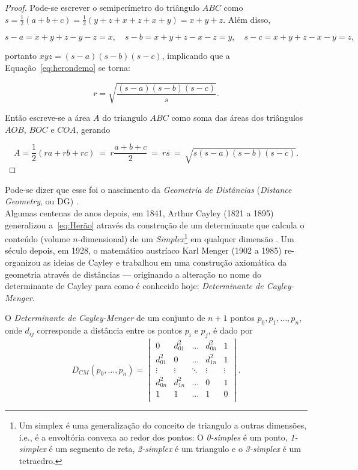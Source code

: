 \begin{teorema}
\begin{proof}
		\noindent Pode-se escrever o semiperímetro do triângulo $ABC$ como $s=\frac{1}{2}(a+b+c)=\frac{1}{2}(y+z+x+z+x+y) = x+y+z$. Além disso,
		
		$$s-a=x+y+z-y-z=x, \quad s-b = x+y+z-x-z = y, \quad s-c = x+y+z-x-y=z,$$
		
		\noindent portanto $xyz = (s-a)(s-b)(s-c)$, implicando que a Equação~\ref{eq:herondemo} se torna:
		
		$$r = \sqrt{\frac{(s-a)(s-b)(s-c)}{s}}.$$
		
		\noindent Então escreve-se a área $A$ do triangulo $ABC$ como soma das áreas dos triângulos $AOB$, $BOC$ e $COA$, gerando
		
		$$A = \frac{1}{2}(ra + rb+ rc) \ =\ r\frac{a+b+c}{2} \ =\ rs \ =\ \sqrt{s(s-a)(s-b)(s-c)}.$$
	\end{proof}
\end{teorema}

Pode-se dizer que esse foi o nascimento da \textit{Geometria de Distâncias} (\textit{Distance Geometry}, ou DG) \cite{libertiSixGemsDGHistory}.
\\

Algumas centenas de anos depois, em 1841, Arthur Cayley (1821 a 1895) generalizou a~\ref{eq:Herão} através da construção de um determinante que calcula o conteúdo (volume $n$-dimensional) de um \textit{Simplex}\footnote{Um simplex é uma generalização do conceito de triangulo a outras dimensões, i.e., é a envoltória convexa ao redor dos pontos: O \textit{0-simples} é um ponto, \textit{1-simplex} é um segmento de reta, \textit{2-simplex} é um triangulo e o \textit{3-simplex} é um tetraedro.} em qualquer dimensão \cite{cayley1841HaronGD, douglasGD}. Um século depois, em 1928, o matemático austríaco Karl Menger (1902 a 1985) re-organizou as ideias de Cayley e trabalhou em uma construção axiomática da geometria através de distâncias \cite{mengerDeterminante} --- originando a alteração no nome do determinante de Cayley para como é conhecido hoje: \textit{Determinante de Cayley-Menger}.  

\begin{definicao}
	O \emph{Determinante de Cayley-Menger} de um conjunto de $n+1$ pontos $p_0,p_1,\dots,p_n$, onde $d_{ij}$ corresponde a distância entre os pontos $p_i$ e $p_j$, é dado por
	\begin{equation}\tag{Determinante de Cayley-Menger}
		D_{CM}(p_0,\dots,p_n) = 
		\begin{vmatrix}
			0 & d^2_{01} & \ldots & d^2_{0n} & 1\\ 
			d^2_{01} & 0 & \ldots & d^2_{1n} & 1\\ 
			\vdots & \vdots & \ddots & \vdots & \vdots\\ 
			d^2_{0n} & d^2_{1n} & \ldots & 0 & 1\\ 
			1 & 1 & \ldots & 1 & 0\\ 
		\end{vmatrix}.
		\label{determinanteCayleyMenger}
	\end{equation}
\end{definicao}

